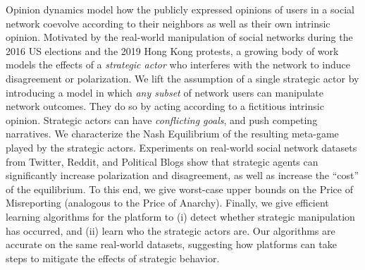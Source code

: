 Opinion dynamics model how the publicly expressed opinions of users in a social network coevolve according to their neighbors as well as their own intrinsic opinion. Motivated by the real-world manipulation of social networks during the 2016 US elections and the 2019 Hong Kong protests, a growing body of work models the effects of a {\em strategic actor} who interferes with the network to induce disagreement or polarization. We lift the assumption of a single strategic actor by introducing a model in which {\em any subset} of network users can manipulate network outcomes. They do so by acting according to a fictitious intrinsic opinion. Strategic actors can have {\em conflicting goals}, and push competing narratives. We characterize the Nash Equilibrium of the resulting meta-game played by the strategic actors. Experiments on real-world social network datasets from Twitter, Reddit, and Political Blogs show that strategic agents can significantly increase polarization and disagreement, as well as increase the ``cost'' of the equilibrium. To this end, we give worst-case upper bounds on the Price of Misreporting (analogous to the Price of Anarchy).  Finally, we give efficient learning algorithms for the platform to (i) detect whether strategic manipulation has occurred, and (ii) learn who the strategic actors are. Our algorithms are accurate on the same real-world datasets, suggesting how platforms can take steps to mitigate the effects of strategic behavior.


